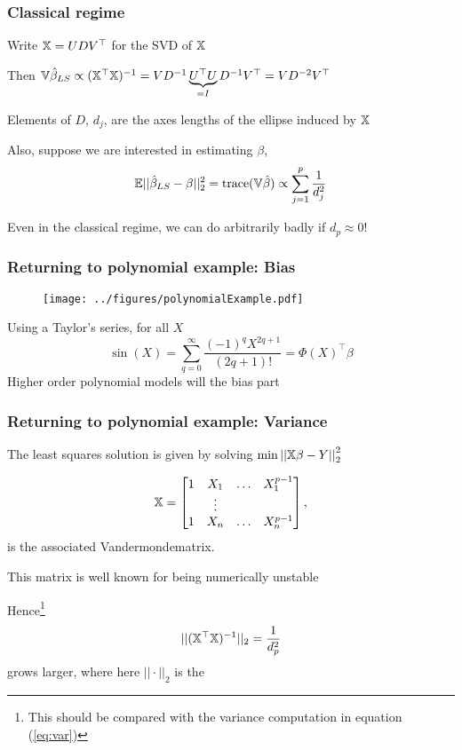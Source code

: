 \documentclass{beamer}
\begin{document}
\begin{frame}
\frametitle{Classical regime}
Write $\mathbb{X} = U D V^{\top}$ for the SVD of $\mathbb{X}$
\vsp

Then $\mathbb{V} \hat\beta_{LS}  \propto (\mathbb{X}^{\top}\mathbb{X})^{-1}  
= 
VD^{-1}\underbrace{U^{\top}U}_{=I} D^{-1} V^{\top}
=
VD^{-2}  V^{\top}$
\vsp

 Elements of $D$, $d_j$, are the axes lengths of the ellipse induced by $\mathbb{X}$
\vsp

Also, suppose we are interested in estimating $\beta$,
\[
\mathbb{E}|| \hat\beta_{LS} - \beta||_2^2  =  \textrm{trace}(\mathbb{V}\hat\beta) \propto \sum_{j=1}^p \frac{1}{d_j^2}
\]
\vsp

 Even in the classical regime, we can do arbitrarily badly if $d_p \approx 0$!
\end{frame}


\begin{frame}
\frametitle{Returning to polynomial example: Bias}
\begin{figure}
\centering
  \texttt{[image: ../figures/polynomialExample.pdf]}
\end{figure}

Using a Taylor's series, for all $X$
\[
\sin(X) = \sum_{q = 0}^\infty \frac{(-1)^qX^{2q+1}}{(2q + 1)!}  = \Phi(X)^{\top}\beta
\]
Higher order polynomial models will  the bias part
\end{frame}
\begin{frame}
\frametitle{Returning to polynomial example: Variance}
The least squares solution is given by solving $\min \left|\left| \mathbb{X}\beta - Y \right|\right|_2^2$

\[
\mathbb{X} =
\begin{bmatrix}
1 & X_1 & \ldots & X_1^{p-1} \\
   & \vdots && \\
 1 & X_n & \ldots & X_n^{p-1} \\
\end{bmatrix},
\]
is the associated Vandermonde\Note matrix. 

\vsp
This matrix is well known for being numerically unstable

\vsp
{} 

\vsp 
Hence\footnote{This should be compared with the variance computation in equation (\ref{eq:var})}
\[
||(\mathbb{X}^{\top}\mathbb{X})^{-1}||_2 = \frac{1}{d_p^2}
\]
grows larger, where here $||\cdot||_2$ is the \Note
\end{frame}
\end{document}
